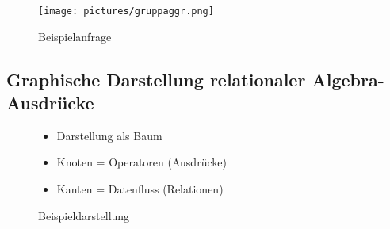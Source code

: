 \documentclass[12pt,a4paper]{article}
\begin{document}
\begin{figure}[H]
\centering
\texttt{[image: pictures/gruppaggr.png]}
\caption{Beispielanfrage}
\end{figure}

\subsection{Graphische Darstellung relationaler Algebra-Ausdrücke}

\begin{figure}[H]
\begin{minipage}[t]{.45\textwidth}
\begin{itemize}
\item Darstellung als Baum
\item Knoten = Operatoren (Ausdrücke)
\item Kanten = Datenfluss (Relationen)
\end{itemize}
\end{minipage}
\hfill
\begin{minipage}[t]{.45\textwidth}
\centering
\vspace{-10mm}
\caption{Beispieldarstellung}
\end{minipage}
\end{figure}
\end{document}
